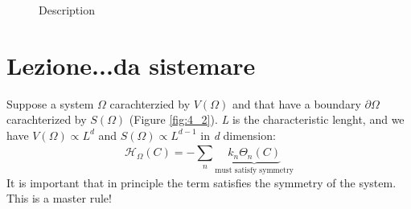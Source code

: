 \documentclass[../main/main.tex]{subfiles}
\begin{document}
\begin{figure}[h!]
\begin{minipage}[c]{0.5\linewidth}
\centering
{}
\end{minipage}
\begin{minipage}[]{0.5\linewidth}
\centering
{}
\end{minipage}
\caption{\label{fig:} Description}
\end{figure}

\section{Lezione...da sistemare}


Suppose a system \( \Omega  \) carachterzied by \( V(\Omega ) \) and that have a boundary \( \partial{\Omega }  \) carachterized by \( S(\Omega ) \) (Figure \ref{fig:4_2}).
\emph{L} is the characteristic lenght, and we have \( V(\Omega ) \propto L^d \) and \( S(\Omega) \propto L^{d-1} \)  in \emph{d} dimension:
\begin{equation}
  \mathcal{H}_{\Omega } (C) = - \sum_{n}^{} \underbrace{ k_n \Theta _n (C)}_{\text{must satisfy symmetry}}
  \label{eq:}
\end{equation}
It is important that in principle the term satisfies the symmetry of the system.
This is a master rule!
\end{document}
